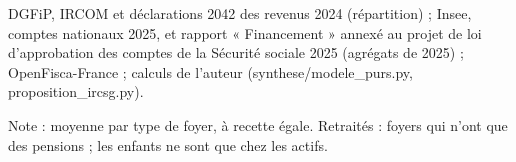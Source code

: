 DGFiP, IRCOM et déclarations 2042 des revenus 2024 (répartition) ; Insee, comptes nationaux 2025, et rapport « Financement » annexé au projet de loi d'approbation des comptes de la Sécurité sociale 2025 (agrégats de 2025) ; OpenFisca-France ; calculs de l'auteur (synthese/modele\_purs.py, proposition\_ircsg.py).\par Note : moyenne par type de foyer, à recette égale. Retraités : foyers qui n'ont que des pensions ; les enfants ne sont que chez les actifs.
